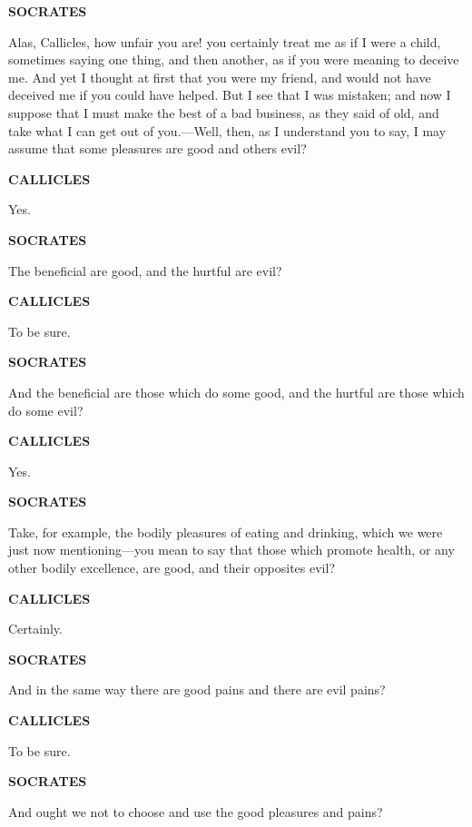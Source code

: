 \documentclass[11pt,letter]{article}
\begin{document}
\par \textbf{SOCRATES}
\par   Alas, Callicles, how unfair you are! you certainly treat me as if I were a child, sometimes saying one thing, and then another, as if you were meaning to deceive me. And yet I thought at first that you were my friend, and would not have deceived me if you could have helped. But I see that I was mistaken; and now I suppose that I must make the best of a bad business, as they said of old, and take what I can get out of you.—Well, then, as I understand you to say, I may assume that some pleasures are good and others evil?

\par \textbf{CALLICLES}
\par   Yes.

\par \textbf{SOCRATES}
\par   The beneficial are good, and the hurtful are evil?

\par \textbf{CALLICLES}
\par   To be sure.

\par \textbf{SOCRATES}
\par   And the beneficial are those which do some good, and the hurtful are those which do some evil?

\par \textbf{CALLICLES}
\par   Yes.

\par \textbf{SOCRATES}
\par   Take, for example, the bodily pleasures of eating and drinking, which we were just now mentioning—you mean to say that those which promote health, or any other bodily excellence, are good, and their opposites evil?

\par \textbf{CALLICLES}
\par   Certainly.

\par \textbf{SOCRATES}
\par   And in the same way there are good pains and there are evil pains?

\par \textbf{CALLICLES}
\par   To be sure.

\par \textbf{SOCRATES}
\par   And ought we not to choose and use the good pleasures and pains?
\end{document}
